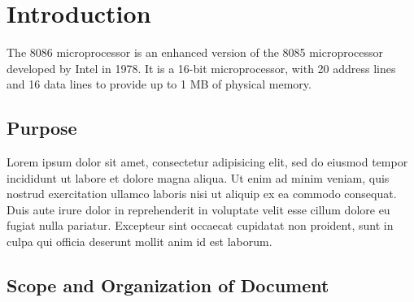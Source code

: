 \newpage
\section{Introduction}
The 8086 microprocessor is an enhanced version of the 8085 microprocessor developed by Intel in 1978. It is a 16-bit microprocessor, with 20 address lines and 16 data lines to provide up to 1 MB of physical memory. 

    \subsection{Purpose}
    Lorem ipsum dolor sit amet, consectetur adipisicing elit, sed do eiusmod
    tempor incididunt ut labore et dolore magna aliqua. Ut enim ad minim veniam,
    quis nostrud exercitation ullamco laboris nisi ut aliquip ex ea commodo
    consequat. Duis aute irure dolor in reprehenderit in voluptate velit esse
    cillum dolore eu fugiat nulla pariatur. Excepteur sint occaecat cupidatat non
    proident, sunt in culpa qui officia deserunt mollit anim id est laborum.

    \subsection{Scope and Organization of Document}
